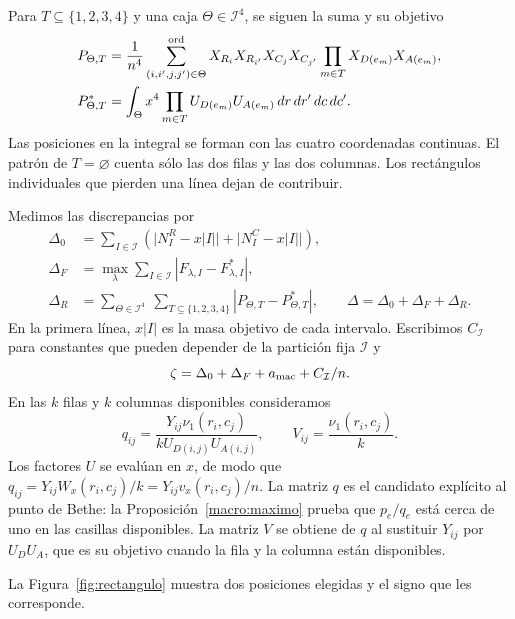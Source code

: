 \begin{definicion}\label{macro:rectangulos}
Para $T\subseteq\{1,2,3,4\}$ y una caja $\Theta\in\mathcal I^4$, se siguen la suma y su objetivo
\begin{align*}
 P_{\Theta,T}&=\frac1{n^4}
 \sum_{(i,i',j,j')\in\Theta}^{\rm ord}
 X_{R_i}X_{R_{i'}}X_{C_j}X_{C_{j'}}
 \prod_{m\in T}X_{D(e_m)}X_{A(e_m)},\\
 P^*_{\Theta,T}&=\int_\Theta x^4\prod_{m\in T}U_{D(e_m)}U_{A(e_m)}
                  \,dr\,dr'\,dc\,dc'.
\end{align*}
Las posiciones en la integral se forman con las cuatro coordenadas continuas. El patrón de
$T=\varnothing$ cuenta sólo las dos filas y las dos columnas. Los rectángulos individuales que pierden
una línea dejan de contribuir.
\end{definicion}

Medimos las discrepancias por
\begin{align*}
 \Delta_0&=\sum_{I\in\mathcal I}
   (\bigl|N^R_I-x|I|\bigr|+\bigl|N^C_I-x|I|\bigr|),\\
 \Delta_F&=\max_{\lambda}\sum_{I\in\mathcal I}|F_{\lambda,I}-F^*_{\lambda,I}|,\\
 \Delta_R&=\sum_{\Theta\in\mathcal I^4}\ \sum_{T\subseteq\{1,2,3,4\}}
                      |P_{\Theta,T}-P^*_{\Theta,T}|,\qquad
 \Delta=\Delta_0+\Delta_F+\Delta_R .
\end{align*}
En la primera línea, $x|I|$ es la masa objetivo de cada intervalo. Escribimos $C_{\mathcal I}$ para
constantes
que pueden depender de la partición fija $\mathcal I$ y
\[
 \zeta=\Delta_0+\Delta_F+a_{\rm mac}+C_{\mathcal I}/n .
\]
En las $k$ filas y $k$ columnas disponibles consideramos
\[
 q_{ij}=\frac{Y_{ij}\nu_1(r_i,c_j)}{kU_{D(i,j)}U_{A(i,j)}},\qquad
 V_{ij}=\frac{\nu_1(r_i,c_j)}k .
\]
Los factores $U$ se evalúan en $x$, de modo que $q_{ij}=Y_{ij}W_x(r_i,c_j)/k=Y_{ij}v_x(r_i,c_j)/n$.
La matriz $q$ es el candidato explícito al punto de Bethe: la Proposición~\ref{macro:maximo} prueba
que $p_e/q_e$ está cerca de uno en las casillas disponibles. La matriz $V$ se obtiene de $q$ al
sustituir $Y_{ij}$ por $U_DU_A$, que es su objetivo cuando la fila y la columna están disponibles.

La Figura~\ref{fig:rectangulo} muestra dos posiciones elegidas y el signo que les corresponde.



